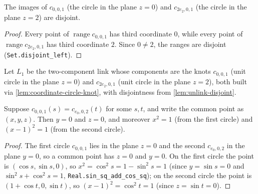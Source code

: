 \begin{lemma}
    \label{lem:unlink-disjoint}
    The images of $c_{0,0,1}$ (the circle in the plane $z=0$) and $c_{2e_2,0,1}$
    (the circle in the plane $z=2$) are disjoint.
\end{lemma}
\begin{proof}
    Every point of $\operatorname{range} c_{0,0,1}$ has third coordinate $0$, while
    every point of $\operatorname{range} c_{2e_2,0,1}$ has third coordinate $2$.
    Since $0\neq 2$, the ranges are disjoint (\texttt{Set.disjoint\_left}).
\end{proof}

\begin{definition}
    \label{def:unlink}
    Let $L_1$ be the two-component link whose components are the knots
    $c_{0,0,1}$ (unit circle in the plane $z=0$) and $c_{2e_2,0,1}$ (unit circle in
    the plane $z=2$), both built via \cref{lem:coordinate-circle-knot}, with
    disjointness from \cref{lem:unlink-disjoint}.
\end{definition}

\begin{lemma}
    \label{lem:hopf-common-point-coords}
    Suppose $c_{0,0,1}(s) = c_{e_0,0,2}(t)$ for some $s,t$, and write the common
    point as $(x,y,z)$. Then $y = 0$ and $z = 0$, and moreover $x^2 = 1$ (from the
    first circle) and $(x-1)^2 = 1$ (from the second circle).
\end{lemma}
\begin{proof}
    The first circle $c_{0,0,1}$ lies in the plane $z=0$ and the second
    $c_{e_0,0,2}$ in the plane $y=0$, so a common point has $z=0$ and $y=0$. On the
    first circle the point is $(\cos s,\sin s,0)$, so $x^2 = \cos^2 s
    = 1 - \sin^2 s = 1$ (since $y=\sin s=0$ and $\sin^2 s+\cos^2 s=1$,
    \texttt{Real.sin\_sq\_add\_cos\_sq}); on the second circle the point is
    $(1+\cos t,0,\sin t)$, so $(x-1)^2 = \cos^2 t = 1$ (since $z=\sin t=0$).
\end{proof}


